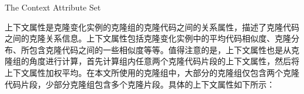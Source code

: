 
{The Context Attribute Set}

上下文属性是克隆变化实例的克隆组的克隆代码之间的关系属性，描述了克隆代码之间的克隆关系信息。上下文属性包括克隆变化实例中的平均代码相似度、克隆分布、所包含克隆代码之间的一些相似度等等。值得注意的是，上下文属性也是从克隆组的角度进行计算，首先计算组内任意两个克隆代码片段的上下文属性，然后将上下文属性加权平均。在本文所使用的克隆组中，大部分的克隆组仅包含两个克隆代码片段，少部分克隆组包含多个克隆片段。具体的上下文属性如下所示：

